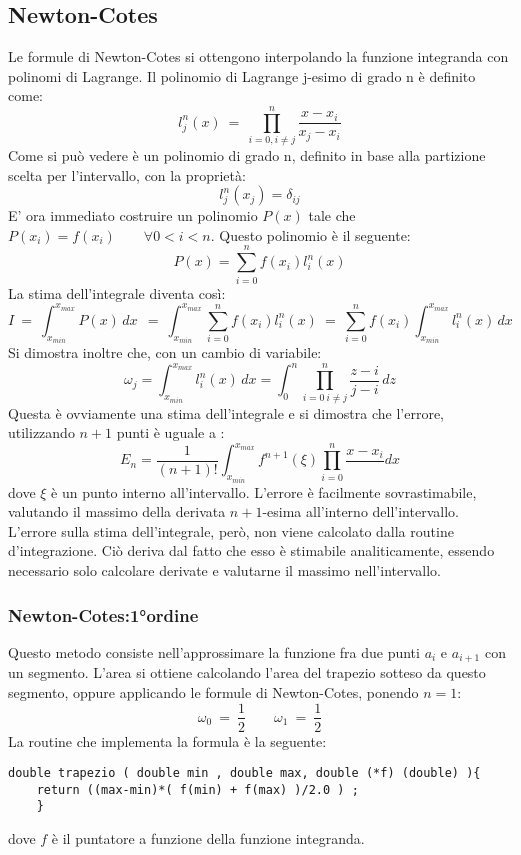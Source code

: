 \subsection*{Newton-Cotes}
Le formule di Newton-Cotes si ottengono interpolando la funzione integranda con polinomi di Lagrange.
Il polinomio di Lagrange j-esimo di grado n è definito come:
$$
	l_j^n (x)\ = \ \prod_{i = 0, i \ne j}^{n} \frac{x-x_i}{x_j - x_i}
$$
	Come si può vedere è un polinomio di grado n, definito in base alla partizione scelta per l'intervallo, con la proprietà:
$$
	l_j^n ( x_j) = \delta_{ij}
$$
E' ora immediato costruire un polinomio $P(x)$ tale che $ P(x_i) = f(x_i) \qquad \forall  0<i<n$.
Questo polinomio è il seguente:
$$
	P(x) = \sum_{i = 0}^n f(x_i) l_i^n(x)
$$
La stima dell'integrale diventa così:
$$
 I \ = \ \int_{x_{min}}^{x_{max}} P(x) \, dx \ \ = \ \int_{x_{min}}^{x_{max}} \sum_{i = 0}^n f(x_i) l_i^n(x)  \ =  \ \sum_{i = 0}^n f(x_i) \int_{x_{min}}^{x_{max}} l_i^n(x) \,dx 
$$
 Si dimostra inoltre che, con un cambio di variabile:
 $$
 \omega_j = \int_{x_{min}}^{x_{max}} l_i^n(x) \,dx  = \int_{0}^{n} \prod_{i = 0 \ i \ne j}^n \frac{z-i}{j-i}\,dz 
$$
Questa è ovviamente una stima dell'integrale e si dimostra che l'errore, utilizzando $n+1$ punti è uguale a :
$$
 E_n = \frac{1}{(n+1)!} \int_{x_{min}}^{x_{max}} f^{n+1}(\xi) \prod_{i = 0}^n \frac{x-x_i} \, dx
$$
dove $\xi$ è un punto interno all'intervallo. L'errore è facilmente sovrastimabile, valutando il massimo della derivata $n+1$-esima all'interno dell'intervallo. L'errore sulla stima dell'integrale,
però, non viene calcolato dalla routine d'integrazione. Ciò deriva dal fatto che esso è stimabile analiticamente, essendo necessario solo calcolare derivate e valutarne il massimo nell'intervallo.

\subsubsection*{Newton-Cotes:1°ordine}
Questo metodo consiste nell'approssimare la funzione fra due punti $a_i$ e $a_{i+1}$ con un segmento.
L'area si ottiene calcolando l'area del trapezio sotteso da questo segmento, oppure applicando le formule di Newton-Cotes, ponendo $ n = 1$: 
$$
\omega_0 \ = \ \frac{1}{2} \qquad \omega_1 \ = \ \frac{1}{2}
$$
La routine che implementa la formula è la seguente:
\begin{verbatim}
double trapezio ( double min , double max, double (*f) (double) ){
	return ((max-min)*( f(min) + f(max) )/2.0 ) ;
	}
\end{verbatim}
dove $f$ è il puntatore a funzione della funzione integranda.

